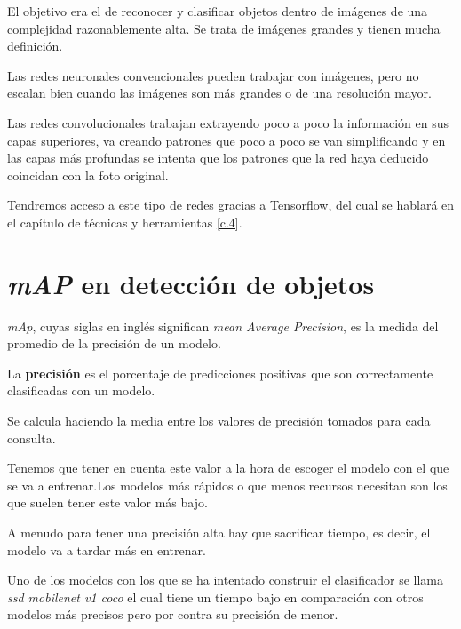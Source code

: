 El objetivo era el de reconocer y clasificar objetos dentro de imágenes de una complejidad razonablemente alta.
Se trata de imágenes grandes y tienen mucha definición.

Las redes neuronales convencionales pueden trabajar con imágenes, pero no escalan bien cuando las imágenes son más grandes o de una resolución mayor.

Las redes convolucionales\cite{neurona} trabajan extrayendo poco a poco la información en sus capas superiores, va creando patrones que poco a poco se van simplificando y en las capas más profundas se intenta que los patrones que la red haya deducido coincidan con la foto original.

Tendremos acceso a este tipo de redes gracias a Tensorflow, del cual se hablará en el capítulo de técnicas y herramientas \ref{c.4}.


\section{\textit{mAP} en detección de objetos}

\textit{mAp}, cuyas siglas en inglés significan  \textit{mean Average Precision}, es la medida del promedio de la precisión de un modelo.

La \textbf{precisión} es el porcentaje de predicciones positivas que son correctamente clasificadas con un modelo.

Se calcula haciendo la media entre los valores de precisión tomados para cada consulta.

Tenemos que tener en cuenta este valor a la hora de escoger el modelo con el que se va a entrenar.Los modelos más rápidos o que menos recursos necesitan son los que suelen tener este valor más bajo.

A menudo para tener una precisión alta hay que sacrificar tiempo, es decir, el modelo va a tardar más en entrenar.

Uno de los modelos con los que se ha intentado construir el clasificador se llama \textit{ssd mobilenet v1 coco} el cual tiene un tiempo bajo en comparación con otros modelos más precisos pero por contra su precisión de menor.



